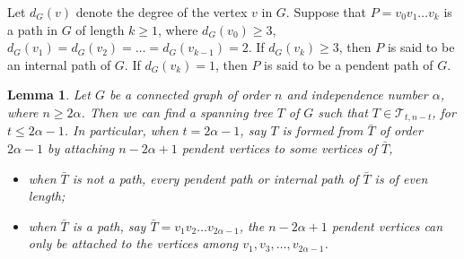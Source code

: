 \documentclass[12pt]{article}
\newtheorem{Lemma}{Lemma}[section]
\begin{document}
Let $d_G(v)$ denote the degree of the vertex $v$ in $G$. Suppose that $P= v_0 v_1 \dots v_k$ is a path in $G$ of length $k \ge 1$, where $d_G(v_0) \ge 3$, $d_G(v_1) = d_G(v_2) = \dots = d_G(v_{k-1}) = 2$.
If $d_G(v_k) \ge 3$, then $P$
is said to be an internal path of $G$. If $d_G(v_k) = 1$, then $P$ is said to be a pendent path of $G$.

\begin{Lemma} \label{le-final-add}
Let $G$ be a connected graph of order $n$ and independence number $\alpha$, where $n \ge 2 \alpha$. Then we can find a spanning tree $T$ of $G$ such that $T \in \mathcal{T}_{t, n-t}$, for $t \le 2 \alpha - 1$. In particular, when $t = 2 \alpha - 1$, say $T$ is formed from $\bar{T}$ of order $2 \alpha - 1$ by attaching $n - 2 \alpha + 1$ pendent vertices to some vertices of $\bar{T}$,
\begin{itemize}

\item[(i)]
when $\bar{T}$ is not a path, every pendent path or internal path of $\bar{T}$ is of even length;

\item[(ii)]

when $\bar{T}$ is a path, say $\bar{T} = v_1 v_2 \dots v_{2 \alpha - 1}$, the $n - 2 \alpha + 1$ pendent vertices can only be attached to the vertices among $v_1, v_3, \dots, v_{2 \alpha - 1}$.

\end{itemize}
\end{Lemma}
\end{document}
